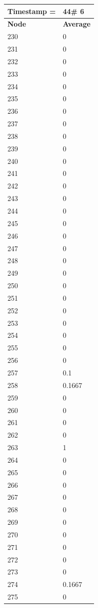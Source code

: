 \begin{tabular}{|l||l|}
\hline
\textbf{Timestamp =} & \textbf{44}\# 6\\\hline
	\textbf{Node} & \textbf{Average} \\ \hline
\hline
	230 & 0 \\ \hline
	231 & 0 \\ \hline
	232 & 0 \\ \hline
	233 & 0 \\ \hline
	234 & 0 \\ \hline
	235 & 0 \\ \hline
	236 & 0 \\ \hline
	237 & 0 \\ \hline
	238 & 0 \\ \hline
	239 & 0 \\ \hline
	240 & 0 \\ \hline
	241 & 0 \\ \hline
	242 & 0 \\ \hline
	243 & 0 \\ \hline
	244 & 0 \\ \hline
	245 & 0 \\ \hline
	246 & 0 \\ \hline
	247 & 0 \\ \hline
	248 & 0 \\ \hline
	249 & 0 \\ \hline
	250 & 0 \\ \hline
	251 & 0 \\ \hline
	252 & 0 \\ \hline
	253 & 0 \\ \hline
	254 & 0 \\ \hline
	255 & 0 \\ \hline
	256 & 0 \\ \hline
	257 & 0.1 \\ \hline
	258 & 0.1667 \\ \hline
	259 & 0 \\ \hline
	260 & 0 \\ \hline
	261 & 0 \\ \hline
	262 & 0 \\ \hline
	263 & 1 \\ \hline
	264 & 0 \\ \hline
	265 & 0 \\ \hline
	266 & 0 \\ \hline
	267 & 0 \\ \hline
	268 & 0 \\ \hline
	269 & 0 \\ \hline
	270 & 0 \\ \hline
	271 & 0 \\ \hline
	272 & 0 \\ \hline
	273 & 0 \\ \hline
	274 & 0.1667 \\ \hline
	275 & 0 \\ \hline
\end{tabular}

